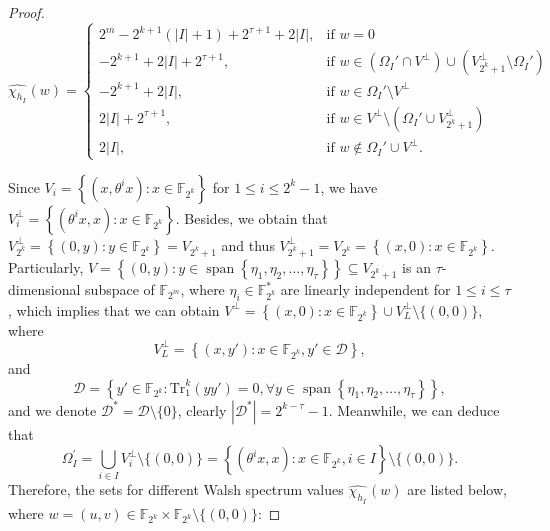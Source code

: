 \documentclass[10pt]{article}
\newcommand{\F}{\mathbb{F}}
\newcommand{\0}{\textbf{0}}
\newcommand{\1}{\textbf{1}}
\newcommand{\tr}{\mathrm{Tr}_1^k}
\newcommand{\W}[2][]{\widehat{\chi_{#2}}^{#1}}
\newcommand{\CardI}{\left|I\right|}
\begin{document}
{{\begin{proof}
\begin{equation}
    \W{h_I}(w)= \left\{
    \begin{array}{llllll}
    2^m-2^{k+1}(\CardI+1)+2^{\tau+1}+2\CardI, & \text{if }w=0\\ 
    -2^{k+1}+2\CardI+2^{\tau+1}, & \text{if }w\in\left( \Omega_I'\cap V^{\perp} \right)\cup \left( V_{2^k+1}^{\perp}\setminus\Omega_I' \right)\\
    -2^{k+1}+2\CardI,            & \text{if }w\in\Omega_I'\setminus V^{\perp}\\
    2\CardI+2^{\tau+1},          & \text{if }w\in V^{\perp}\setminus\left( \Omega_I'\cup V_{2^k+1}^{\perp} \right)\\
    2\CardI,                     & \text{if }w\not\in\Omega_I'\cup V^{\perp}.
    \end{array}
    \right.
\end{equation}

Since $V_i=\left\{ (x,\theta^ix):x\in\F_{2^k} \right\}$ for $1\le i\le 2^k-1$, we have $V_i^{\perp}=\left\{ (\theta^ix,x):x\in\F_{2^k} \right\}$. 
Besides, we obtain that $V_{2^k}^{\perp}=\left\{ (0,y):y\in\F_{2^k} \right\}=V_{2^k+1}$ and thus $V_{2^k+1}^{\perp}=V_{2^k}=\left\{ (x,0):x\in\F_{2^k}\right\}$. 
Particularly, $V=\left\{ (0,y):y\in\operatorname{span}\left\{ \eta_1,\eta_2,\dots,\eta_{\tau} \right\} \right\}\subseteq V_{2^k+1}$ is an $\tau$-dimensional subspace of $\F_{2^m}$, where $\eta_i\in\F_{2^k}^*$ are linearly independent for $1\le i\le\tau$, which implies that we can obtain $ V^{\perp}=\left\{ (x,0):x\in\F_{2^k} \right\}\cup V_{L}^{\perp}\setminus\{(0,0)\}$, where 
\[V_L^{\perp}=\left\{ (x,y'):x\in\F_{2^k}, y'\in \mathcal{D}\right\},\]
and 
\[\mathcal{D}=\left\{y'\in\F_{2^k}:\tr(yy')=0,\forall y\in \operatorname{span}\left\{ \eta_1,\eta_2,\dots,\eta_{\tau} \right\} \right\},\]
and we denote $\mathcal{D}^*=\mathcal{D}\setminus\{0\}$, clearly $\left|\mathcal{D}^*\right|=2^{k-\tau}-1$.
Meanwhile, we can deduce that 
\[\Omega_I^{\prime}=\bigcup_{i\in I}V_i^{\perp}\setminus\{(0,0)\}=\left\{ (\theta^ix,x):x\in\F_{2^k}, i\in I \right\}\setminus\{(0,0)\}.\]
Therefore, the sets for different Walsh spectrum values $\W{h_I}(w)$ are listed below, where $w=(u,v)\in\F_{2^k}\times\F_{2^k}\setminus\{(0,0)\}$: 


\end{proof}}}
\end{document}
